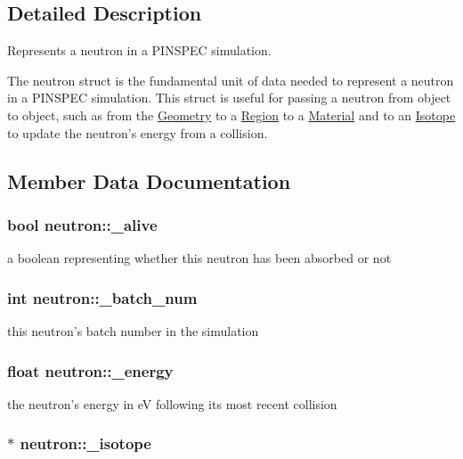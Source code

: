 \subsection{Detailed Description}
Represents a neutron in a P\-I\-N\-S\-P\-E\-C simulation. 

The neutron struct is the fundamental unit of data needed to represent a neutron in a P\-I\-N\-S\-P\-E\-C simulation. This struct is useful for passing a neutron from object to object, such as from the \hyperlink{classGeometry}{Geometry} to a \hyperlink{classRegion}{Region} to a \hyperlink{classMaterial}{Material} and to an \hyperlink{classIsotope}{Isotope} to update the neutron's energy from a collision. 

\subsection{Member Data Documentation}
\hypertarget{structneutron_ad3765df09268634efd4ff2107e3d150b}{
\subsubsection[{\-\_\-alive}]{\setlength{\rightskip}{0pt plus 5cm}bool neutron\-::\-\_\-alive}}\label{structneutron_ad3765df09268634efd4ff2107e3d150b}
a boolean representing whether this neutron has been absorbed or not \hypertarget{structneutron_a0fc51df4fbcc6f41460e937a1f63ead2}{
\subsubsection[{\-\_\-batch\-\_\-num}]{\setlength{\rightskip}{0pt plus 5cm}int neutron\-::\-\_\-batch\-\_\-num}}\label{structneutron_a0fc51df4fbcc6f41460e937a1f63ead2}
this neutron's batch number in the simulation \hypertarget{structneutron_a49d28706c0f2d9f3215fdf6da4e89f41}{
\subsubsection[{\-\_\-energy}]{\setlength{\rightskip}{0pt plus 5cm}float neutron\-::\-\_\-energy}}\label{structneutron_a49d28706c0f2d9f3215fdf6da4e89f41}
the neutron's energy in e\-V following its most recent collision \hypertarget{structneutron_a71574f549781c314902596d3ac4da58a}{
\subsubsection[{\-\_\-isotope}]{$\ast$ neutron\-::\-\_\-isotope}}\label{structneutron_a71574f549781c314902596d3ac4da58a}
